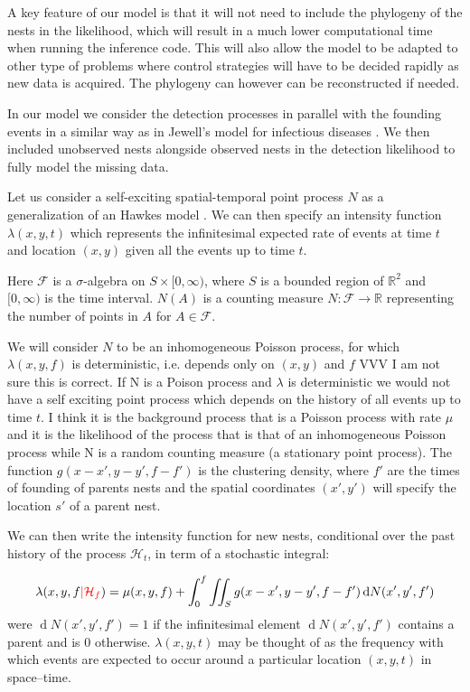\documentclass[11pt,a4paper]{article}
\renewcommand{\d}[1]{\ensuremath{\operatorname{d}\!{#1}}}
\begin{document}
A key feature of our model is that it will not need to include the phylogeny of the nests in the likelihood, which will result in a much lower computational time when running the inference code. This will also allow the model to be adapted to other type of problems where control strategies will have to be decided rapidly as new data is acquired. {\color{red}The phylogeny can however can be reconstructed if needed}.

In our model we consider the detection processes in parallel with the founding events in a similar way as in Jewell's model for infectious diseases \cite{Jewell}. We then included unobserved nests alongside observed nests in the detection likelihood to fully model the missing data.

Let us consider a self-exciting spatial-temporal point process $N$ as a generalization of an Hawkes model {\color{red} \cite{Hawkes71}}. We can then specify an intensity function $\lambda(x, y, t)$ which represents the infinitesimal expected  rate of events at time $t$ and location $(x, y)$  given all the events up to time $t$.

Here $\mathcal{F}$ is a $\sigma$-algebra on $S \times [0, \infty )$, where $S$ is a bounded region of $\mathbb{R}^2$ and $[0, \infty)$ is the time interval. $N(A)$ is a counting measure $N: \mathcal{F} \to \mathbb{R}$ representing the number of points in $A$ for $A \in \mathcal{F}$.

We will consider $N$ to be an inhomogeneous Poisson process, for which $\lambda(x, y, f)$ is deterministic, i.e. depends only on $(x, y)$ and $f$ \cite{Shoenberg} {\color{red}VVV I am not sure this is correct. If N is a Poison process and $\lambda$ is deterministic we would not have a self exciting point process which depends on the history of all events up to time $t$. I think it is the background process that is a Poisson process with rate $\mu$ and it is the likelihood of the process that is that of an inhomogeneous Poisson process while N is a random counting measure (a stationary point process)}. The function $g(x - x', y - y', f - f')$ is the clustering density, where $f'$ are the times of founding of parents nests and the spatial coordinates $(x', y')$ will specify the location $s'$ of a parent nest.

We can then write the intensity function for new nests, {\color{red} conditional over the past history of the process $\mathcal{H}_t$}, in term of a stochastic integral:

\begin{equation}\label{eq:intensity}
    \lambda(x, y, f {\color{red}| \mathcal{H}_f}) = \mu(x, y, f) + \int_{0}^{f} \iint_{S} g(x - x', y - y', f - f') \d N(x', y', f')
\end{equation}
were $\d N(x', y', f') = 1$ if the infinitesimal element $\d N(x', y', f')$ contains a parent and is 0 otherwise. $\lambda(x, y, t)$ may be thought of as the frequency with which events are expected to occur around a particular location $(x, y, t)$ in space–time.
\end{document}
